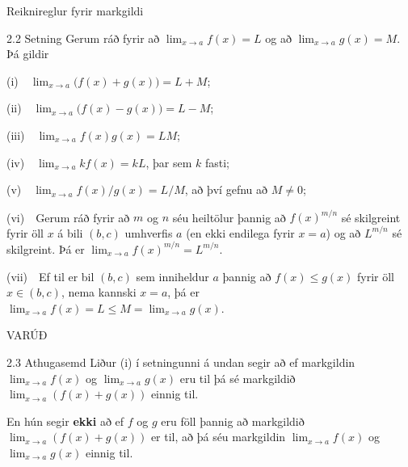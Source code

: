 \documentclass[icelandic,a4paper,12pt]{article}
\begin{document}
\begin{frame}{Reiknireglur fyrir markgildi}
\pause
 \begin{block}{2.2 Setning}
   Gerum ráð fyrir að
$\lim_{x\rightarrow a}f(x)=L$ og að   $\lim_{x\rightarrow a}g(x)=M$.
Þá gildir

\pause

(i)\ \ $\lim_{x\rightarrow a}\Big(f(x)+g(x)\Big)=L+M$;

(ii)\  \ $\lim_{x\rightarrow a}\Big(f(x)-g(x)\Big)=L-M$;

\pause

(iii)\ \  $\lim_{x\rightarrow a}f(x)g(x)=LM$;

(iv)\ \  $\lim_{x\rightarrow a}kf(x)=kL$, þar sem $k$ fasti;

(v)\ \  $\lim_{x\rightarrow a}f(x)/g(x)=L/M$, að því gefnu að $M\neq 0$;

\pause

(vi)\ \ Gerum ráð fyrir að $m$ og $n$ séu 
heiltölur þannig að $f(x)^{m/n}$ sé
  skilgreint fyrir öll $x$ á bili $(b,c)$ umhverfis $a$ (en ekki
  endilega fyrir $x=a$) og að $L^{m/n}$ sé skilgreint.
Þá er $\lim_{x\rightarrow a}f(x)^{m/n}=L^{m/n}$.

\pause

(vii)\ \   Ef til er bil $(b,c)$ sem inniheldur $a$ þannig 
að $f(x)\leq g(x)$ fyrir öll $x\in (b,c)$, nema kannski $x=a$, þá 
er $\lim_{x\rightarrow a}f(x)=L\leq M=\lim_{x\rightarrow a}g(x)$.

 \end{block}
\end{frame}

\begin{frame}{VARÚÐ}
\begin{block}{2.3 Athugasemd}
	Liður (i) í setningunni á undan segir að ef markgildin
	$\lim_{x\to a} f(x)$ og $\lim_{x\to a} g(x)$ eru til þá
	sé markgildið
	$\lim_{x\to a} (f(x)+g(x))$ einnig til.

\bigskip\pause

	En hún segir {\bf ekki} að ef 
	$f$ og $g$ eru föll þannig að markgildið
	$\lim_{x\to a} (f(x)+g(x))$ er til, að þá séu markgildin
	$\lim_{x\to a} f(x)$ og $\lim_{x\to a} g(x)$ einnig til.
\end{block}
\end{frame}
\end{document}
